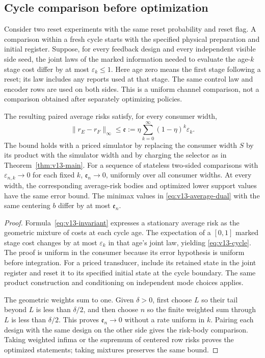 \subsection{Cycle comparison before optimization}
Consider two reset experiments with the same reset probability and
reset flag. A comparison within a fresh cycle starts with the specified
physical preparation and initial register. Suppose, for every feedback
design and every independent visible side seed, the joint laws of the
marked information needed to evaluate the age-$k$ stage cost differ
by at most $\varepsilon_k\le1$. Here age zero means the first stage
following a reset; its law includes any reports used at that stage.
The same control law and encoder rows are used on both sides. This is
a uniform channel comparison, not a comparison obtained after separately
optimizing policies.

\begin{theorem}\label{thm:v13-cycle}
The resulting paired average risks satisfy, for every consumer width,
\begin{equation}\label{eq:v13-cycle}
 \|r_E-r_F\|_\infty\le
       \mathfrak e:=\eta\sum_{k=0}^\infty(1-\eta)^k\varepsilon_k.
\end{equation}
The bound holds with a priced simulator by replacing the consumer width
$S$ by its product with the simulator width and by charging the selector
as in Theorem~\ref{thm:v13-main}. For a sequence of stateless two-sided
comparisons with $\varepsilon_{n,k}\to0$ for each fixed $k$,
$\mathfrak e_n\to0$, uniformly over all consumer widths. At every width,
the corresponding average-risk bodies and optimized lower support
values have the same error bound. The minimax values in
\eqref{eq:v13-average-dual} with the same centering $b$ differ by at
most $\mathfrak e_n$.
\end{theorem}
\begin{proof}
Formula~\eqref{eq:v13-invariant} expresses a stationary average risk as
the geometric mixture of costs at each cycle age. The expectation of
a $[0,1]$ marked stage cost changes by at most $\varepsilon_k$ in that
age's joint law, yielding \eqref{eq:v13-cycle}. The proof is uniform in
the consumer because its error hypothesis is uniform before integration.
For a priced transducer, include its retained state in the joint
register and reset it to its specified initial state at the cycle
boundary. The same product construction and conditioning on independent
mode choices applies.

The geometric weights sum to one. Given $\delta>0$, first choose $L$
so their tail beyond $L$ is less than $\delta/2$, and then choose $n$
so the finite weighted sum through $L$ is less than $\delta/2$.
This proves $\mathfrak e_n\to0$ without a rate uniform in $k$.
Pairing each design with the same design on the other side gives the
risk-body comparison. Taking weighted infima or the supremum of
centered row risks proves the optimized statements; taking mixtures
preserves the same bound.
\end{proof}

